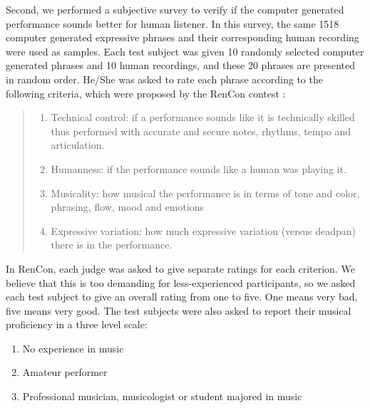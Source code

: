 Second, we performed a subjective survey to verify if the computer generated performance sounds better for human listener.  In this survey, the same 1518 computer generated expressive phrases and their corresponding human recording were used as samples. Each test subject was given 10 randomly selected computer generated phrases and 10 human recordings, and these 20 phrases are presented in random order. He/She was asked to rate each phrase according to the following criteria, which were proposed by the RenCon contest \cite{RenCon}:
\begin{quote}
\begin{enumerate}
   \item Technical control: if a performance sounds like it is technically skilled thus performed with accurate and secure notes, rhythms, tempo and articulation.
   \item  Humanness: if the performance sounds like a human was playing it.
   \item  Musicality: how musical the performance is in terms of tone and color, phrasing, flow, mood and emotions
   \item Expressive variation: how much expressive variation (versus deadpan) there is in the performance.
\end{enumerate}
\end{quote}

In RenCon, each judge was asked to give separate ratings for each criterion. We believe that this is too demanding for less-experienced participants, so we asked each test subject to give an overall rating from one to five. One means very bad, five means very good. The test subjects were also asked to report their musical proficiency in a three level scale:
\begin{enumerate}
   \item No experience in music 
   \item Amateur performer
   \item Professional musician, musicologist or student majored in music
\end{enumerate}


